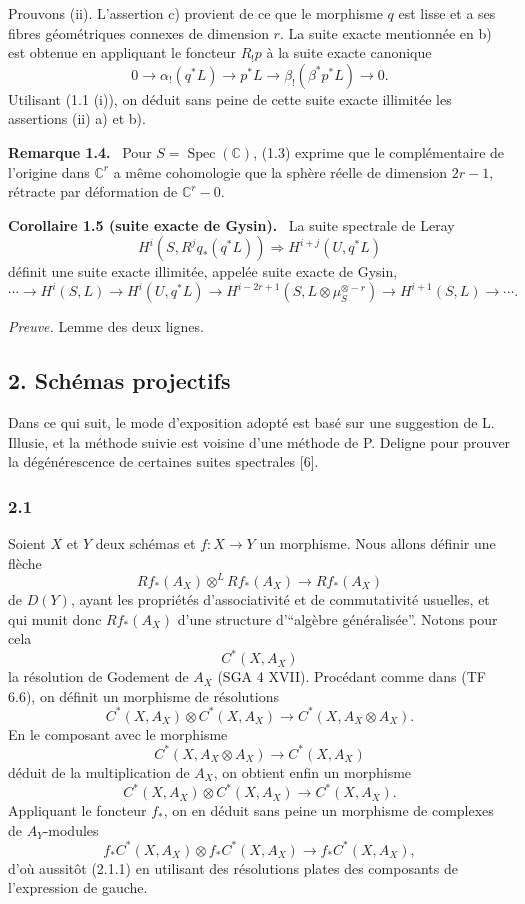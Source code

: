 \documentclass[11pt]{article}
\newenvironment{statement}[1]{\par\medskip\noindent\textbf{#1.}\ }{\par\medskip}
\begin{document}
Prouvons (ii). L'assertion c) provient de ce que le morphisme $q$ est lisse et a ses fibres géométriques connexes de dimension $r$. La suite exacte mentionnée en b) est obtenue en appliquant le foncteur $R_!p$ à la suite exacte canonique
\[
0\longrightarrow \alpha_!(q^*L)\longrightarrow p^*L\longrightarrow \beta_!(\beta^*p^*L)\longrightarrow 0.
\]
Utilisant (1.1 (i)), on déduit sans peine de cette suite exacte illimitée les assertions (ii) a) et b).

\begin{statement}{Remarque 1.4}
Pour $S=\operatorname{Spec}(\mathbb C)$, (1.3) exprime que le complémentaire de l'origine dans $\mathbb C^r$ a même cohomologie que la sphère réelle de dimension $2r-1$, rétracte par déformation de $\mathbb C^r-0$.
\end{statement}

\begin{statement}{Corollaire 1.5 (suite exacte de Gysin)}
La suite spectrale de Leray
\[
H^i(S,R^j q_*(q^*L))\Rightarrow H^{i+j}(U,q^*L)
\]
définit une suite exacte illimitée, appelée suite exacte de Gysin,
\[
\cdots\longrightarrow H^i(S,L)\longrightarrow H^i(U,q^*L)\longrightarrow
H^{i-2r+1}(S,L\otimes\mu_S^{\otimes -r})\longrightarrow H^{i+1}(S,L)\longrightarrow\cdots.
\]
\end{statement}

\emph{Preuve.} Lemme des deux lignes.

\subsection*{2. Schémas projectifs}

Dans ce qui suit, le mode d'exposition adopté est basé sur une suggestion de L. Illusie, et la méthode suivie est voisine d'une méthode de P. Deligne pour prouver la dégénérescence de certaines suites spectrales [6].

\subsubsection*{2.1}
Soient $X$ et $Y$ deux schémas et $f:X\to Y$ un morphisme. Nous allons définir une flèche
\[
Rf_*(A_X)\otimes^L Rf_*(A_X)\longrightarrow Rf_*(A_X)
\tag{2.1.1}
\]
de $D(Y)$, ayant les propriétés d'associativité et de commutativité usuelles, et qui munit donc $Rf_*(A_X)$ d'une structure d'``algèbre généralisée''. Notons pour cela
\[
C^*(X,A_X)
\]
la résolution de Godement de $A_X$ (SGA 4 XVII). Procédant comme dans (TF 6.6), on définit un morphisme de résolutions
\[
C^*(X,A_X)\otimes C^*(X,A_X)\longrightarrow C^*(X,A_X\otimes A_X).
\]
En le composant avec le morphisme
\[
C^*(X,A_X\otimes A_X)\longrightarrow C^*(X,A_X)
\]
déduit de la multiplication de $A_X$, on obtient enfin un morphisme
\[
C^*(X,A_X)\otimes C^*(X,A_X)\longrightarrow C^*(X,A_X).
\tag{2.1.2}
\]
Appliquant le foncteur $f_*$, on en déduit sans peine un morphisme de complexes de $A_Y$-modules
\[
f_*C^*(X,A_X)\otimes f_*C^*(X,A_X)\longrightarrow f_*C^*(X,A_X),
\]
d'où aussitôt (2.1.1) en utilisant des résolutions plates des composants de l'expression de gauche.
\end{document}
